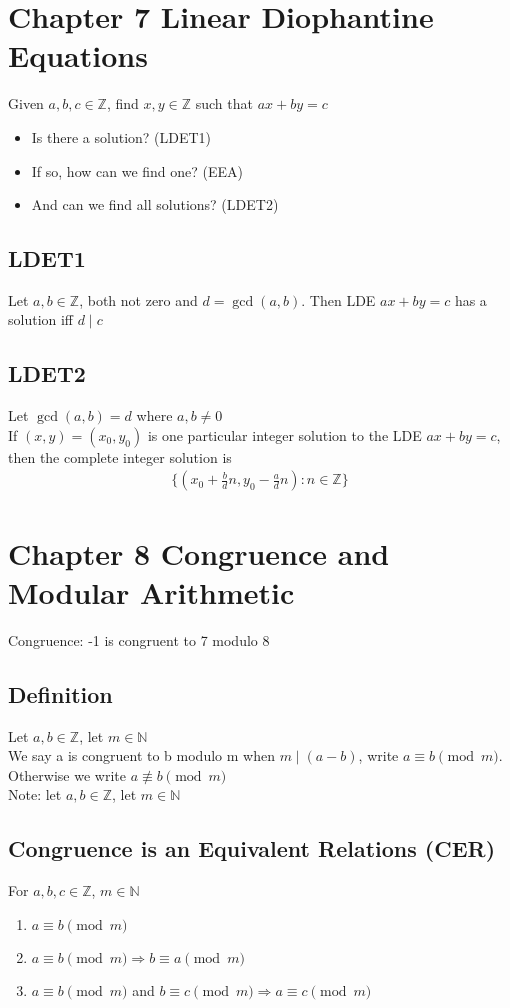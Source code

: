\documentclass[12pt, letterpaper]{article}
\begin{document}
\section{Chapter 7 Linear Diophantine Equations}
Given $a,b,c \in \mathbb{Z}$, find $x,y \in \mathbb{Z}$ such that $ax+by=c$
\begin{itemize}
    \item Is there a solution? (LDET1)
    \item If so, how can we find one? (EEA)
    \item And can we find all solutions? (LDET2)
\end{itemize}
\subsection{LDET1}
Let $a,b \in \mathbb{Z}$, both not zero and $d = \gcd(a,b)$. Then LDE $ax+by=c$ has a solution iff $d \mid c$
\subsection{LDET2}
Let $\gcd(a,b) = d$ where $a,b \neq 0$ \\
If $(x,y) = (x_0, y_0)$ is one particular integer solution to the LDE $ax+by=c$, then the complete integer solution is 
\begin{align*}
    \{(x_0 + \frac{b}{d}n, y_0 - \frac{a}{d}n) : n \in \mathbb{Z} \}
\end{align*}

\section{Chapter 8 Congruence and Modular Arithmetic}
Congruence: -1 is congruent to 7 modulo 8 
\subsection{Definition}
Let $a,b \in \mathbb{Z}$, let $m \in \mathbb{N}$ \\
We say a is congruent to b modulo m when $m \mid (a-b)$, write $a \equiv b \pmod{m}$. Otherwise we write $a \not\equiv b \pmod{m}$ \\ 
Note: let $a,b \in \mathbb{Z}$, let $m \in \mathbb{N}$ 
\subsection{Congruence is an Equivalent Relations (CER)}
For $a,b,c \in \mathbb{Z}$, $m \in \mathbb{N}$
\begin{enumerate}
    \item $a \equiv b \pmod{m}$
    \item $a \equiv b \pmod{m} \Rightarrow b \equiv a \pmod{m}$
    \item $a \equiv b \pmod{m}$ and $b \equiv c \pmod{m} \Rightarrow a \equiv c \pmod{m}$
\end{enumerate}
\end{document}
